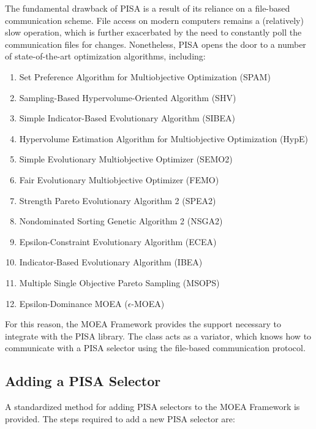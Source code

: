 The fundamental drawback of PISA is a result of its reliance on a file-based communication scheme.  File access on modern computers remains a (relatively) slow operation, which is further exacerbated by the need to constantly poll the communication files for changes.  Nonetheless, PISA opens the door to a number of state-of-the-art optimization algorithms, including:

\begin{enumerate}
  \item Set Preference Algorithm for Multiobjective Optimization (SPAM)
  \item Sampling-Based Hypervolume-Oriented Algorithm (SHV)
  \item Simple Indicator-Based Evolutionary Algorithm (SIBEA)
  \item Hypervolume Estimation Algorithm for Multiobjective Optimization (HypE)
  \item Simple Evolutionary Multiobjective Optimizer (SEMO2)
  \item Fair Evolutionary Multiobjective Optimizer (FEMO)
  \item Strength Pareto Evolutionary Algorithm 2 (SPEA2)
  \item Nondominated Sorting Genetic Algorithm 2 (NSGA2)
  \item Epsilon-Constraint Evolutionary Algorithm (ECEA)
  \item Indicator-Based Evolutionary Algorithm (IBEA)
  \item Multiple Single Objective Pareto Sampling (MSOPS)
  \item Epsilon-Dominance MOEA ($\epsilon$-MOEA)
\end{enumerate}

For this reason, the MOEA Framework provides the support necessary to integrate with the PISA library.  The  class acts as a variator, which knows how to communicate with a PISA selector using the file-based communication protocol.

\subsection{Adding a PISA Selector}
A standardized method for adding PISA selectors to the MOEA Framework is provided.  The steps required to add a new PISA selector are:

